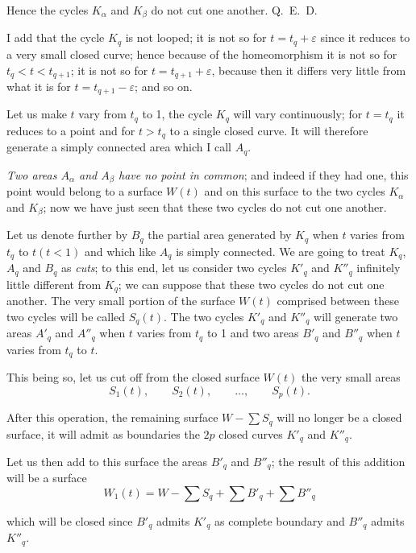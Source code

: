 \documentclass{article}
\begin{document}
Hence the cycles $K_{\alpha}$ and $K_{\beta}$ do not cut one another. Q.~E.~D.

I add that the cycle $K_{q}$ is not looped; it is not so for $t = t_{q} + \varepsilon$ since it reduces to a very small closed curve; hence because of the homeomorphism it is not so for $t_{q} < t < t_{q+1}$; it is not so for $t = t_{q+1} + \varepsilon$, because then it differs very little from what it is for $t = t_{q+1} - \varepsilon$; and so on.

Let us make $t$ vary from $t_{q}$ to 1, the cycle $K_{q}$ will vary continuously; for $t = t_{q}$ it reduces to a point and for $t > t_{q}$ to a single closed curve. It will therefore generate a simply connected area which I call $A_{q}$.

\emph{Two areas $A_{\alpha}$ and $A_{\beta}$ have no point in common}; and indeed if they had one, this point would belong to a surface $W(t)$ and on this surface to the two cycles $K_{\alpha}$ and $K_{\beta}$; now we have just seen that these two cycles do not cut one another.

Let us denote further by $B_{q}$ the partial area generated by $K_{q}$ when $t$ varies from $t_{q}$ to $t (t < 1)$ and which like $A_{q}$ is simply connected. We are going to treat $K_{q}$, $A_{q}$ and $B_{q}$ as \emph{cuts}; to this end, let us consider two cycles $K'_{q}$ and $K''_{q}$ infinitely little different from $K_{q}$; we can suppose that these two cycles do not cut one another. The very small portion of the surface $W(t)$ comprised between these two cycles will be called $S_{q}(t)$. The two cycles $K'_{q}$ and $K''_{q}$ will generate two areas $A'_{q}$ and $A''_{q}$ when $t$ varies from $t_{q}$ to 1 and two areas $B'_{q}$ and $B''_{q}$ when $t$ varies from $t_{q}$ to $t$.

This being so, let us cut off from the closed surface $W(t)$ the very small areas
\[ S_{1}(t), \qquad S_{2}(t), \qquad \ldots, \qquad S_{p}(t). \]

After this operation, the remaining surface $W - \displaystyle\sum S_{q}$ will no longer be a closed surface, it will admit as boundaries the $2p$ closed curves $K'_{q}$ and $K''_{q}$.

Let us then add to this surface the areas $B'_{q}$ and $B''_{q}$; the result of this addition will be a surface
\[ W_{1}(t) = W - \sum S_{q} + \sum B'_{q} + \sum B''_{q} \]

which will be closed since $B'_{q}$ admits $K'_{q}$ as complete boundary and $B''_{q}$ admits $K''_{q}$.
\end{document}
